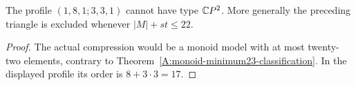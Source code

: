 \begin{corollary}
\label{CP2:A-eight-middle-three-three}
The profile $(1,8,1;3,3,1)$ cannot have type $\mathbb{C}P^2$.
More generally the preceding triangle is excluded whenever
$|M|+st\le22$.
\end{corollary}
\begin{proof}
The actual compression would be a monoid model with at
most twenty-two elements, contrary to
Theorem~\ref{A:monoid-minimum23-classification}. In the
displayed profile its order is $8+3\cdot3=17$.
\end{proof}
